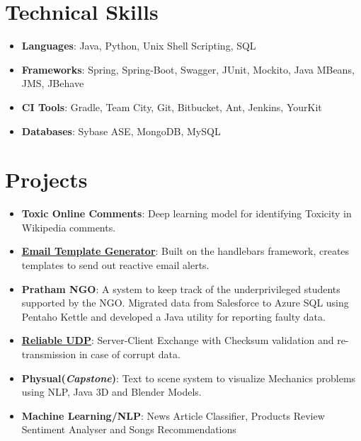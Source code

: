 \documentclass[letterpaper,11pt]{article}
\def\faFlask{\unichar{"F0C3}}
\def\faGears{\unichar{"F085}}
\newcommand{\resumeItem}[2]{
  \item\small{
    \textbf{#1}{: #2 \vspace{-2pt}}
  }
}
\newcommand{\resumeSubItem}[2]{\resumeItem{#1}{#2}\vspace{-4pt}}
\newcommand{\resumeSubHeadingListStart}{\begin{itemize}[leftmargin=*]}
\newcommand{\resumeSubHeadingListEnd}{\end{itemize}}
\begin{document}
\section{{\faGears} Technical Skills}
 \resumeSubHeadingListStart
 \resumeSubItem{Languages}{Java, Python, Unix Shell Scripting, SQL}
 \resumeSubItem{Frameworks}{Spring, Spring-Boot, Swagger, JUnit, Mockito, Java MBeans, JMS, JBehave}
 \resumeSubItem{CI Tools}{Gradle, Team City, Git, Bitbucket, Ant, Jenkins, YourKit}
 \resumeSubItem{Databases}{Sybase ASE, MongoDB, MySQL}
 \resumeSubHeadingListEnd

\section{{\faFlask} Projects}
  \resumeSubHeadingListStart
  \resumeSubItem{Toxic Online Comments} {
  Deep learning model for identifying Toxicity in Wikipedia comments.
  }
  \resumeSubItem{\href{https://github.com/amanpreet692/HandleBarsEmailTemplate}
    {Email Template Generator}}
    {Built on the handlebars framework, creates templates to send out reactive email alerts.}
    \resumeSubItem{Pratham NGO}
      {A system to keep track of the  underprivileged students supported by the NGO. Migrated data from Salesforce to Azure SQL using Pentaho Kettle and developed a Java utility for reporting faulty data.}
    \resumeSubItem{\href{https://bitbucket.org/APS692/udp-with-error-detection} {Reliable UDP}}
      {Server-Client Exchange with Checksum validation and re-transmission in case of corrupt data.}
  \resumeSubItem{Physual(\textit{Capstone})}
      {Text to scene system to visualize Mechanics problems using NLP, Java 3D and Blender Models.}
\resumeSubItem{Machine Learning/NLP}
    {News Article Classifier, Products Review Sentiment Analyser and Songs Recommendations
    }      
  \resumeSubHeadingListEnd
\end{document}
